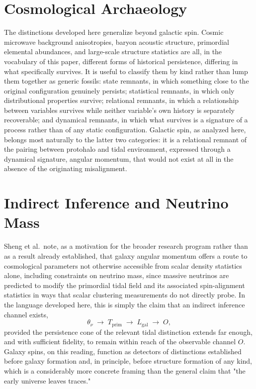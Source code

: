 \documentclass[11pt]{article}
\begin{document}
\section{Cosmological Archaeology}

The distinctions developed here generalize beyond galactic spin. Cosmic microwave background anisotropies, baryon acoustic structure, primordial elemental abundances, and large-scale structure statistics are all, in the vocabulary of this paper, different forms of historical persistence, differing in what specifically survives. It is useful to classify them by kind rather than lump them together as generic fossils: state remnants, in which something close to the original configuration genuinely persists; statistical remnants, in which only distributional properties survive; relational remnants, in which a relationship between variables survives while neither variable's own history is separately recoverable; and dynamical remnants, in which what survives is a signature of a process rather than of any static configuration. Galactic spin, as analyzed here, belongs most naturally to the latter two categories: it is a relational remnant of the pairing between protohalo and tidal environment, expressed through a dynamical signature, angular momentum, that would not exist at all in the absence of the originating misalignment.

\section{Indirect Inference and Neutrino Mass}

Sheng et al.\ note, as a motivation for the broader research program rather than as a result already established, that galaxy angular momentum offers a route to cosmological parameters not otherwise accessible from scalar density statistics alone, including constraints on neutrino mass, since massive neutrinos are predicted to modify the primordial tidal field and its associated spin-alignment statistics in ways that scalar clustering measurements do not directly probe. In the language developed here, this is simply the claim that an indirect inference channel exists,
\begin{equation}
\theta_\nu \;\to\; T_{\mathrm{prim}} \;\to\; L_{\mathrm{gal}} \;\to\; O,
\end{equation}
provided the persistence cone of the relevant tidal distinction extends far enough, and with sufficient fidelity, to remain within reach of the observable channel $O$. Galaxy spins, on this reading, function as detectors of distinctions established before galaxy formation and, in principle, before structure formation of any kind, which is a considerably more concrete framing than the general claim that "the early universe leaves traces."
\end{document}
